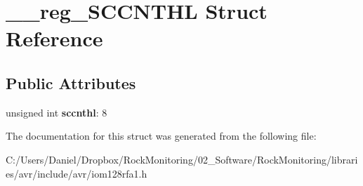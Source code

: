 \hypertarget{struct____reg___s_c_c_n_t_h_l}{}\section{\+\_\+\+\_\+reg\+\_\+\+S\+C\+C\+N\+T\+HL Struct Reference}
\label{struct____reg___s_c_c_n_t_h_l}
\subsection*{Public Attributes}
\begin{DoxyCompactItemize}
\item 
unsigned int {\bfseries sccnthl}\+: 8\hypertarget{struct____reg___s_c_c_n_t_h_l_a4da3bde9483f5b9bd9f1467f561a2e31}{}\label{struct____reg___s_c_c_n_t_h_l_a4da3bde9483f5b9bd9f1467f561a2e31}

\end{DoxyCompactItemize}


The documentation for this struct was generated from the following file\+:\begin{DoxyCompactItemize}
\item 
C\+:/\+Users/\+Daniel/\+Dropbox/\+Rock\+Monitoring/02\+\_\+\+Software/\+Rock\+Monitoring/libraries/avr/include/avr/iom128rfa1.\+h\end{DoxyCompactItemize}
